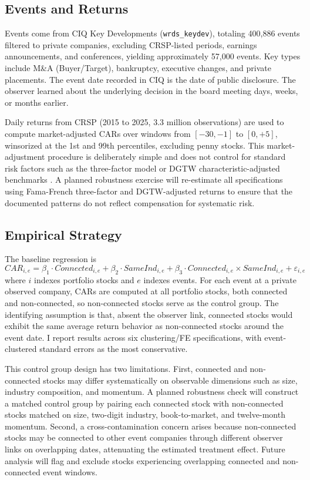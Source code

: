\documentclass[12pt]{article}
\begin{document}
\subsection{Events and Returns}

Events come from CIQ Key Developments (\texttt{wrds\_keydev}), totaling 400,886 events filtered to private companies, excluding CRSP-listed periods, earnings announcements, and conferences, yielding approximately 57,000 events. Key types include M\&A (Buyer/Target), bankruptcy, executive changes, and private placements. The event date recorded in CIQ is the date of public disclosure. The observer learned about the underlying decision in the board meeting days, weeks, or months earlier.

Daily returns from CRSP (2015 to 2025, 3.3 million observations) are used to compute market-adjusted CARs over windows from $[-30,-1]$ to $[0,+5]$, winsorized at the 1st and 99th percentiles, excluding penny stocks. This market-adjustment procedure is deliberately simple and does not control for standard risk factors such as the  three-factor model or DGTW characteristic-adjusted benchmarks \cite{daniel1997measuring}. A planned robustness exercise will re-estimate all specifications using Fama-French three-factor and DGTW-adjusted returns to ensure that the documented patterns do not reflect compensation for systematic risk.

\subsection{Empirical Strategy}

The baseline regression is
\begin{equation}
\label{eq:baseline}
CAR_{i,e} = \beta_1 \cdot Connected_{i,e} + \beta_2 \cdot SameInd_{i,e} + \beta_3 \cdot Connected_{i,e} \times SameInd_{i,e} + \varepsilon_{i,e}
\end{equation}
where $i$ indexes portfolio stocks and $e$ indexes events. For each event at a private observed company, CARs are computed at all portfolio stocks, both connected and non-connected, so non-connected stocks serve as the control group. The identifying assumption is that, absent the observer link, connected stocks would exhibit the same average return behavior as non-connected stocks around the event date. I report results across six clustering/FE specifications, with event-clustered standard errors as the most conservative.

This control group design has two limitations. First, connected and non-connected stocks may differ systematically on observable dimensions such as size, industry composition, and momentum. A planned robustness check will construct a matched control group by pairing each connected stock with non-connected stocks matched on size, two-digit industry, book-to-market, and twelve-month momentum. Second, a cross-contamination concern arises because non-connected stocks may be connected to other event companies through different observer links on overlapping dates, attenuating the estimated treatment effect. Future analysis will flag and exclude stocks experiencing overlapping connected and non-connected event windows.
\end{document}
